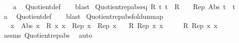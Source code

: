 \begin{isabellebody}
%
\isadelimproof
\ \ %
\endisadelimproof
%
\isatagproof
{}\isamarkupfalse%
\ a\ \isamarkupfalse%
\ Quotient{\isacharunderscore}{\kern0pt}def\isanewline
\ \ \isamarkupfalse%
\ blast%
\endisatagproof
{\isafoldproof}%
%
\isadelimproof
\isanewline
%
\endisadelimproof
\isanewline
{}\isamarkupfalse%
\ Quotient{\isacharunderscore}{\kern0pt}rep{\isacharunderscore}{\kern0pt}abs{\isacharunderscore}{\kern0pt}eq{\isacharcolon}{\kern0pt}\ {\isachardoublequoteopen}R\ t\ t\ {\isasymLongrightarrow}\ R\ {\isasymle}\ {\isacharparenleft}{\kern0pt}{\isacharequal}{\kern0pt}{\isacharparenright}{\kern0pt}\ {\isasymLongrightarrow}\ Rep\ {\isacharparenleft}{\kern0pt}Abs\ t{\isacharparenright}{\kern0pt}\ {\isacharequal}{\kern0pt}\ t{\isachardoublequoteclose}\isanewline
%
\isadelimproof
\ \ %
\endisadelimproof
%
\isatagproof
{}\isamarkupfalse%
\ a\ \isamarkupfalse%
\ Quotient{\isacharunderscore}{\kern0pt}def\isanewline
\ \ \isamarkupfalse%
\ blast%
\endisatagproof
{\isafoldproof}%
%
\isadelimproof
\isanewline
%
\endisadelimproof
\isanewline
{}\isamarkupfalse%
\ Quotient{\isacharunderscore}{\kern0pt}rep{\isacharunderscore}{\kern0pt}abs{\isacharunderscore}{\kern0pt}fold{\isacharunderscore}{\kern0pt}unmap{\isacharcolon}{\kern0pt}\isanewline
\ \ \ {\isachardoublequoteopen}x{\isacharprime}{\kern0pt}\ {\isasymequiv}\ Abs\ x{\isachardoublequoteclose}\ \ {\isachardoublequoteopen}R\ x\ x{\isachardoublequoteclose}\ \ {\isachardoublequoteopen}Rep\ x{\isacharprime}{\kern0pt}\ {\isasymequiv}\ Rep{\isacharprime}{\kern0pt}\ x{\isacharprime}{\kern0pt}{\isachardoublequoteclose}\isanewline
\ \ \ {\isachardoublequoteopen}R\ {\isacharparenleft}{\kern0pt}Rep{\isacharprime}{\kern0pt}\ x{\isacharprime}{\kern0pt}{\isacharparenright}{\kern0pt}\ x{\isachardoublequoteclose}\isanewline
%
\isadelimproof
%
\endisadelimproof
%
\isatagproof
{}\isamarkupfalse%
\ {\isacharminus}{\kern0pt}\isanewline
\ \ \isamarkupfalse%
\ {\isachardoublequoteopen}R\ {\isacharparenleft}{\kern0pt}Rep\ x{\isacharprime}{\kern0pt}{\isacharparenright}{\kern0pt}\ x{\isachardoublequoteclose}\ \isamarkupfalse%
\ assms{\isacharparenleft}{\kern0pt}{}{\isacharminus}{\kern0pt}{}{\isacharparenright}{\kern0pt}\ Quotient{\isacharunderscore}{\kern0pt}rep{\isacharunderscore}{\kern0pt}abs\ \isamarkupfalse%
\ auto\isanewline
\ \ \isamarkupfalse%

\end{isabellebody}
